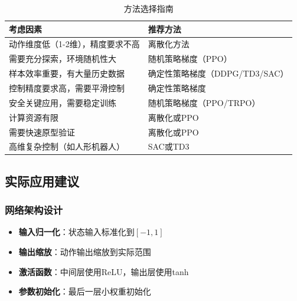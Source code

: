\begin{table}[H]
\centering
\caption{方法选择指南}
\begin{tabular}{p{}p{}}
\toprule
\textbf{考虑因素} & \textbf{推荐方法} \\
\midrule
动作维度低（1-2维），精度要求不高 & 离散化方法 \\
需要充分探索，环境随机性大 & 随机策略梯度（PPO） \\
样本效率重要，有大量历史数据 & 确定性策略梯度（DDPG/TD3/SAC） \\
控制精度要求高，需要平滑控制 & 确定性策略梯度 \\
安全关键应用，需要稳定训练 & 随机策略梯度（PPO/TRPO） \\
计算资源有限 & 离散化或PPO \\
需要快速原型验证 & 离散化或PPO \\
高维复杂控制（如人形机器人） & SAC或TD3 \\
\bottomrule
\end{tabular}
\end{table}

\subsection{实际应用建议}

\subsubsection{网络架构设计}
\begin{itemize}
    \item \textbf{输入归一化}：状态输入标准化到$[-1, 1]$
    \item \textbf{输出缩放}：动作输出缩放到实际范围
    \item \textbf{激活函数}：中间层使用ReLU，输出层使用tanh
    \item \textbf{参数初始化}：最后一层小权重初始化
\end{itemize}
